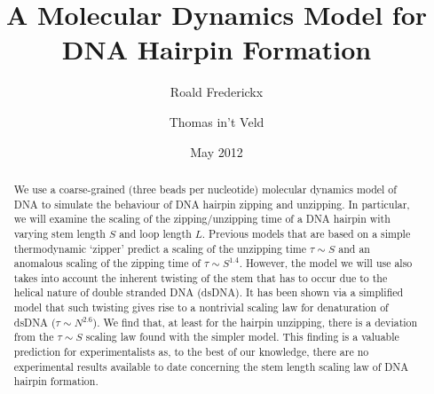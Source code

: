 \documentclass[a4paper, 11pt]{article}
\title{A Molecular Dynamics Model for DNA Hairpin Formation}
\author{Roald Frederickx \and Thomas in't Veld}
\date{May 2012}
\begin{document}
\maketitle

\begin{abstract}
We use a coarse-grained (three beads per nucleotide) molecular dynamics model of DNA to simulate the behaviour of DNA hairpin zipping and unzipping. In particular, we will examine the scaling of the zipping/unzipping time of a DNA hairpin with varying stem length $S$ and loop length $L$. Previous models that are based on a simple thermodynamic `zipper' predict a scaling of the unzipping time $\tau \sim S$ and an anomalous scaling of the zipping time of $\tau \sim S^{1.4}$. However, the model we will use also takes into account the inherent twisting of the stem that has to occur due to the helical nature of double stranded DNA (dsDNA). It has been shown via a simplified model that such twisting gives rise to a nontrivial scaling law for denaturation of dsDNA ($\tau \sim N^{2.6}$). We find that, at least for the hairpin unzipping, there is a deviation from the $\tau \sim S$ scaling law found with the simpler model. This finding is a valuable prediction for experimentalists as, to the best of our knowledge, there are no experimental results available to date concerning the stem length scaling law of DNA hairpin formation.
\end{abstract}
\newpage
\tableofcontents








\footnotesize

	
\end{document}
